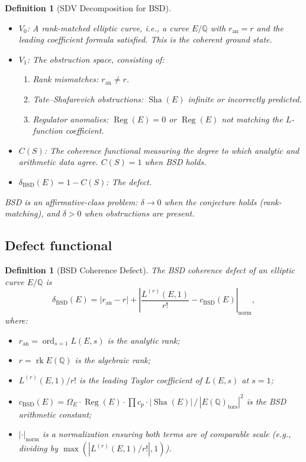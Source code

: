 \documentclass[11pt]{article}
\newtheorem{definition}[theorem]{Definition}
\DeclareMathOperator{\rk}{rk}
\DeclareMathOperator{\ord}{ord}
\DeclareMathOperator{\Reg}{Reg}
\DeclareMathOperator{\Sha}{Sha}
\begin{document}
\begin{definition}[SDV Decomposition for BSD]
\label{def:sdv}
\leavevmode
\begin{itemize}
  \item $V_0$: A rank-matched elliptic curve, i.e., a curve $E/\mathbb{Q}$
    with $r_{\mathrm{an}} = r$ and the leading coefficient formula satisfied.
    This is the coherent ground state.

  \item $V_1$: The obstruction space, consisting of:
    \begin{enumerate}
      \item Rank mismatches: $r_{\mathrm{an}} \neq r$.
      \item Tate--Shafarevich obstructions: $\Sha(E)$ infinite or incorrectly
        predicted.
      \item Regulator anomalies: $\Reg(E) = 0$ or $\Reg(E)$ not matching the
        $L$-function coefficient.
    \end{enumerate}

  \item $C(S)$: The coherence functional measuring the degree to which
    analytic and arithmetic data agree.  $C(S) = 1$ when BSD holds.

  \item $\delta_{\mathrm{BSD}}(E) = 1 - C(S)$: The defect.
\end{itemize}

BSD is an \emph{affirmative-class} problem: $\delta \to 0$ when the conjecture
holds (rank-matching), and $\delta > 0$ when obstructions are present.
\end{definition}

\subsection{Defect functional}

\begin{definition}[BSD Coherence Defect]
\label{def:delta-BSD}
The \emph{BSD coherence defect} of an elliptic curve $E/\mathbb{Q}$ is
\[
  \delta_{\mathrm{BSD}}(E) =
  |r_{\mathrm{an}} - r| +
  \left| \frac{L^{(r)}(E,1)}{r!} - c_{\mathrm{BSD}}(E) \right|_{\mathrm{norm}},
\]
where:
\begin{itemize}
  \item $r_{\mathrm{an}} = \ord_{s=1} L(E,s)$ is the analytic rank;
  \item $r = \rk E(\mathbb{Q})$ is the algebraic rank;
  \item $L^{(r)}(E,1)/r!$ is the leading Taylor coefficient of $L(E,s)$ at
    $s = 1$;
  \item $c_{\mathrm{BSD}}(E) =
    \Omega_E \cdot \Reg(E) \cdot \prod c_p \cdot |\Sha(E)| \,/\,
    |E(\mathbb{Q})_{\mathrm{tors}}|^2$ is the BSD arithmetic constant;
  \item $|\cdot|_{\mathrm{norm}}$ is a normalization ensuring both terms are of
    comparable scale (e.g., dividing by $\max(|L^{(r)}(E,1)/r!|, 1)$).
\end{itemize}
\end{definition}
\end{document}
